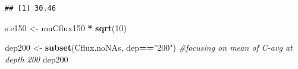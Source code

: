 \documentclass[]{article}
\newenvironment{Shaded}{\begin{snugshade}}{\end{snugshade}}
\newcommand{\CommentTok}[1]{\textcolor[rgb]{0.56,0.35,0.01}{\textit{#1}}}
\newcommand{\DataTypeTok}[1]{\textcolor[rgb]{0.13,0.29,0.53}{#1}}
\newcommand{\DecValTok}[1]{\textcolor[rgb]{0.00,0.00,0.81}{#1}}
\newcommand{\KeywordTok}[1]{\textcolor[rgb]{0.13,0.29,0.53}{\textbf{#1}}}
\newcommand{\NormalTok}[1]{#1}
\newcommand{\OperatorTok}[1]{\textcolor[rgb]{0.81,0.36,0.00}{\textbf{#1}}}
\newcommand{\StringTok}[1]{\textcolor[rgb]{0.31,0.60,0.02}{#1}}
\begin{document}
\begin{Shaded}
\end{Shaded}

\begin{verbatim}
## [1] 30.46
\end{verbatim}

\begin{Shaded}
\begin{Highlighting}[]
\NormalTok{s.e150 <-}\StringTok{ }\NormalTok{muCflux150 }\OperatorTok{*}\StringTok{ }\KeywordTok{sqrt}\NormalTok{(}\DecValTok{10}\NormalTok{)}


\NormalTok{dep200 <-}\StringTok{ }\KeywordTok{subset}\NormalTok{(Cflux.noNAs, dep}\OperatorTok{==}\StringTok{"200"}\NormalTok{) }\CommentTok{#focusing on mean of C-avg at depth 200}
\NormalTok{dep200}
\end{Highlighting}
\end{Shaded}
\end{document}
